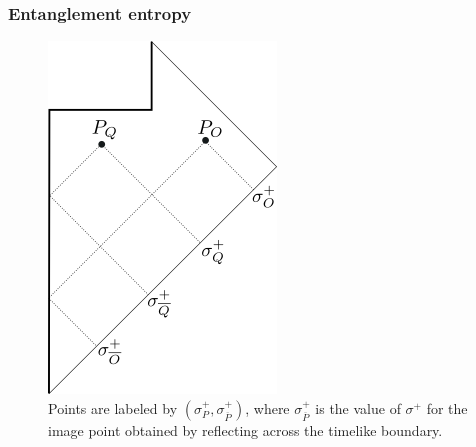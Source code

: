 \documentclass[11pt,oneside,letterpaper]{article}
\numberwithin{equation}{section}
\begin{document}
\subsubsection{Entanglement entropy}


\begin{figure}
\begin{center}
\includegraphics[scale=1.0]{figures/reflect.png}
\end{center}
\caption{\small Points are labeled by $(\sigma^+_P, \sigma^+_{\overline{P}})$, where $\sigma^+_{\overline{P}}$ is the value of $\sigma^+$ for the  image point obtained by reflecting across the timelike boundary.\label{fig:reflect}}
\end{figure}
\end{document}

